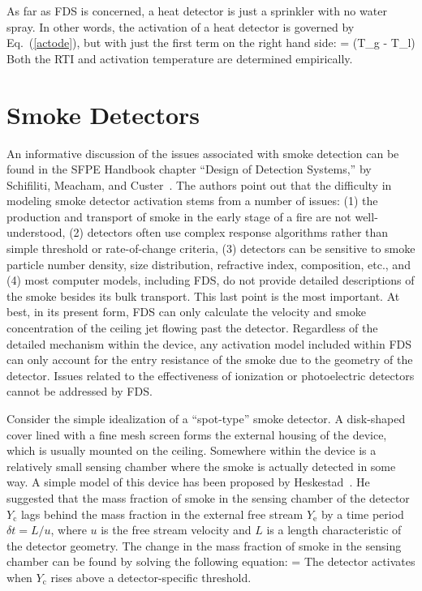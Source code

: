 As far as FDS is concerned, a heat detector is just a sprinkler with no water spray. In other words, the activation of a heat detector is governed by Eq.~(\ref{actode}), but with just the first term on the right hand side:
\be
    =  (T_g - T_l)  \label{heatactode}
\ee
Both the RTI and activation temperature are determined empirically.


\section{Smoke Detectors}

An informative discussion of the issues associated with smoke detection can be found in the SFPE Handbook chapter ``Design of Detection Systems,'' by Schifiliti, Meacham, and Custer~\cite{SFPE}. The authors point out that the difficulty in modeling smoke detector activation stems from a number of issues: (1) the production and transport of smoke in the early stage of a fire are not well-understood, (2) detectors often use
complex response algorithms rather than simple threshold or rate-of-change criteria, (3) detectors can be sensitive to smoke particle number density, size distribution, refractive index, composition, etc., and (4) most computer models, including FDS, do not provide detailed descriptions of the smoke besides its bulk transport. This last point is the most important. At best, in its present form, FDS can only calculate the
velocity and smoke concentration of the ceiling jet flowing past the detector. Regardless of the detailed mechanism within the device, any activation model included within FDS can only account for the entry resistance of the smoke due to the geometry of the detector. Issues related to the effectiveness of ionization or photoelectric detectors cannot be addressed by FDS.

Consider the simple idealization of a ``spot-type'' smoke detector. A disk-shaped cover lined with a fine mesh screen forms the external housing of the device, which is usually mounted on the ceiling. Somewhere within the device is a relatively small sensing chamber where the smoke is actually detected in some way. A simple model of this device has been proposed by Heskestad~\cite{SFPE}. He suggested that the mass fraction of smoke in the sensing chamber of the detector $Y_\mathrm{c}$ lags behind the mass fraction in the external free stream $Y_\mathrm{e}$ by a time period $\delta t = L/u$, where $u$ is the free stream velocity and $L$ is a length characteristic of the detector geometry. The change in the mass fraction of smoke in the sensing chamber can be found by solving the following equation:
\be
    =  \label{HYoeq}
\ee
The detector activates when $Y_\mathrm{c}$ rises above a detector-specific threshold.

